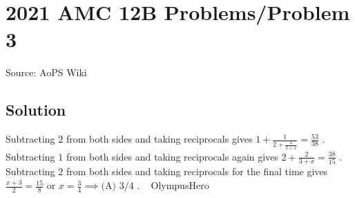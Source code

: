 \documentclass[12pt]{article}
\begin{document}
\section*{{2021 AMC 12B Problems/Problem 3}}
Source: AoPS Wiki

\subsection*{Solution}
Subtracting $2$ from both sides and taking reciprocals gives $1+\frac{1}{2+\frac{2}{3+x}}=\frac{53}{38}$ . Subtracting $1$ from both sides and taking reciprocals again gives $2+\frac{2}{3+x}=\frac{38}{15}$ . Subtracting $2$ from both sides and taking reciprocals for the final time gives $\frac{x+3}{2}=\frac{15}{8}$ or $x=\frac{3}{4} \implies \boxed{\text{(A) } 3/4}$ . ~ OlympusHero
\end{document}

